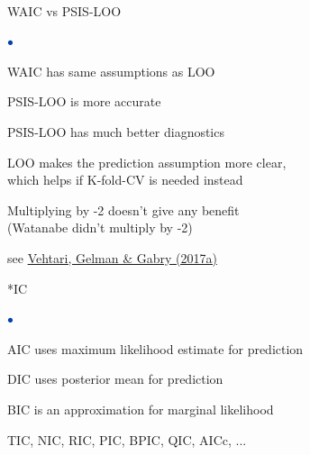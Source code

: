\documentclass[english,t]{beamer}
\newenvironment{list1}{
   \begin{list}{$\color{list1}\bullet$}{\itemsep=6pt}}{
  \end{list}}
\begin{document}
\begin{frame}{}
  \\
  
\end{frame}

\begin{frame}{}

{\Large\color{navyblue} WAIC vs PSIS-LOO}

\begin{list1}
  \item<2-> WAIC has same assumptions as LOO
  \item<3-> PSIS-LOO is more accurate 
  \item<4-> PSIS-LOO has much better diagnostics
  \item<5-> LOO makes the prediction assumption more clear,\\ which
    helps if K-fold-CV is needed instead
  \item<6-> Multiplying by -2 doesn't give any benefit\\ (Watanabe
    didn't multiply by -2)
\end{list1}

\vspace{6\baselineskip}
{\small see \href{http://link.springer.com/article/10.1007/s11222-016-9696-4}{Vehtari, Gelman \& Gabry (2017a)}}
\end{frame}

\begin{frame}{}

{\Large\color{navyblue} *IC}

\begin{list1}
  \item AIC uses maximum likelihood estimate for prediction
  \item DIC uses posterior mean for prediction
  \item BIC is an approximation for marginal likelihood
  \item TIC, NIC, RIC, PIC, BPIC, QIC, AICc, ...
\end{list1}

\end{frame}
\end{document}
